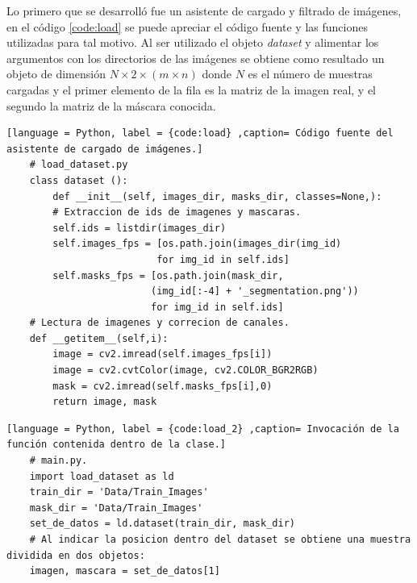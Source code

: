 Lo primero que se desarrolló fue un asistente de cargado y filtrado de imágenes, en el código \ref{code:load} se puede apreciar el código fuente y las funciones utilizadas para tal motivo. Al ser utilizado el objeto \emph{dataset} y alimentar los argumentos con los directorios de las imágenes se obtiene como resultado un objeto de dimensión $N \times 2 \times (m \times n)$ donde $N$ es el número de muestras cargadas y el primer elemento de la fila es la matriz de la imagen real, y el segundo la matriz de la máscara conocida.


\renewcommand{\lstlistingname}{Código}


\lstset{style=pystyle}

\begin{lstlisting}[language = Python, label = {code:load} ,caption= Código fuente del asistente de cargado de imágenes.]
    # load_dataset.py
    class dataset ():
        def __init__(self, images_dir, masks_dir, classes=None,):
        # Extraccion de ids de imagenes y mascaras.
        self.ids = listdir(images_dir)
        self.images_fps = [os.path.join(images_dir(img_id)
                          for img_id in self.ids]
        self.masks_fps = [os.path.join(mask_dir,
                         (img_id[:-4] + '_segmentation.png'))
                         for img_id in self.ids]
    # Lectura de imagenes y correcion de canales.
    def __getitem__(self,i):
        image = cv2.imread(self.images_fps[i])
        image = cv2.cvtColor(image, cv2.COLOR_BGR2RGB)
        mask = cv2.imread(self.masks_fps[i],0)
        return image, mask
\end{lstlisting}

\begin{lstlisting}[language = Python, label = {code:load_2} ,caption= Invocación de la función contenida dentro de la clase.]
    # main.py.
    import load_dataset as ld 
    train_dir = 'Data/Train_Images'
    mask_dir = 'Data/Train_Images'
    set_de_datos = ld.dataset(train_dir, mask_dir)
    # Al indicar la posicion dentro del dataset se obtiene una muestra dividida en dos objetos:
    imagen, mascara = set_de_datos[1]

\end{lstlisting}

